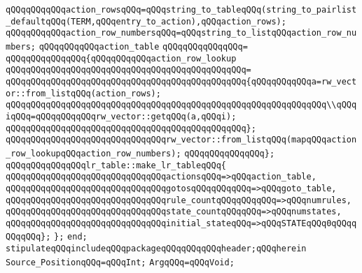 \verb|qQQqqQQqqQQqaction_rowsqQQq=qQQqstring_to_tableqQQq(string_to_pairlist_defaultqQQq(TERM,qQQqentry_to_action),qQQqaction_rows);|\newline
\verb|qQQqqQQqqQQqaction_row_numbersqQQq=qQQqstring_to_listqQQqaction_row_numbers;|\newline
\verb|qQQqqQQqqQQqaction_table|\newline
\verb|qQQqqQQqqQQqqQQq=|\newline
\verb|qQQqqQQqqQQqqQQq{qQQqqQQqqQQqaction_row_lookup|\newline
\verb|qQQqqQQqqQQqqQQqqQQqqQQqqQQqqQQqqQQqqQQqqQQqqQQq=|\newline
\verb|qQQqqQQqqQQqqQQqqQQqqQQqqQQqqQQqqQQqqQQqqQQqqQQq{qQQqqQQqqQQqa=rw_vector::from_listqQQq(action_rows);|\newline
\newline
\verb|qQQqqQQqqQQqqQQqqQQqqQQqqQQqqQQqqQQqqQQqqQQqqQQqqQQqqQQqqQQqqQQq\\qQQqiqQQq=qQQqqQQqqQQqrw_vector::getqQQq(a,qQQqi);|\newline
\verb|qQQqqQQqqQQqqQQqqQQqqQQqqQQqqQQqqQQqqQQqqQQqqQQq};|\newline
\newline
\verb|qQQqqQQqqQQqqQQqqQQqqQQqqQQqqQQqrw_vector::from_listqQQq(mapqQQqaction_row_lookupqQQqaction_row_numbers);|\newline
\verb|qQQqqQQqqQQqqQQq};|\newline
\newline
\verb|qQQqqQQqqQQqqQQqlr_table::make_lr_tableqQQq{|\newline
\verb|qQQqqQQqqQQqqQQqqQQqqQQqqQQqqQQqactionsqQQq=>qQQqaction_table,|\newline
\verb|qQQqqQQqqQQqqQQqqQQqqQQqqQQqqQQqgotosqQQqqQQqqQQq=>qQQqgoto_table,|\newline
\verb|qQQqqQQqqQQqqQQqqQQqqQQqqQQqqQQqrule_countqQQqqQQqqQQq=>qQQqnumrules,|\newline
\verb|qQQqqQQqqQQqqQQqqQQqqQQqqQQqqQQqstate_countqQQqqQQq=>qQQqnumstates,|\newline
\verb|qQQqqQQqqQQqqQQqqQQqqQQqqQQqqQQqinitial_stateqQQq=>qQQqSTATEqQQq0qQQqqQQqqQQq};|\newline
\verb|};|\newline
\verb|end;|\newline
\verb|stipulateqQQqincludeqQQqpackageqQQqqQQqqQQqheader;qQQqherein|\newline
\verb|Source_PositionqQQq=qQQqInt;|\newline
\verb|ArgqQQq=qQQqVoid;|\newline
